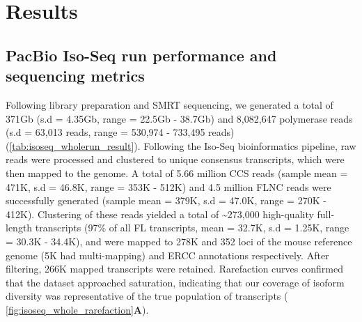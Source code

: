 \newpage
\section{Results}

\subsection{PacBio Iso-Seq run performance and sequencing metrics}
Following library preparation and SMRT sequencing, we generated a total of 371Gb (s.d = 4.35Gb, range = 22.5Gb - 38.7Gb) and 8,082,647 polymerase reads (s.d = 63,013 reads, range = 530,974 - 733,495 reads) (\cref{tab:isoseq_wholerun_result}). Following the Iso-Seq bioinformatics pipeline, raw reads were processed and clustered to unique consensus transcripts, which were then mapped to the genome. A total of 5.66 million CCS reads (sample mean = 471K, s.d = 46.8K, range =  353K - 512K) and 4.5 million FLNC reads were successfully generated (sample mean = 379K, s.d = 47.0K, range = 270K - 412K). Clustering of these reads yielded a total of \textasciitilde273,000 high-quality full-length transcripts (97\% of all FL transcripts, mean = 32.7K, s.d = 1.25K, range = 30.3K - 34.4K), and were mapped to 278K and 352 loci of the mouse reference genome (5K had multi-mapping) and ERCC annotations respectively. After filtering, 266K mapped transcripts were retained. Rarefaction curves confirmed that the dataset approached saturation, indicating that our coverage of isoform diversity was representative of the true population of transcripts (	\cref{fig:isoseq_whole_rarefaction}\textbf{A}). 

